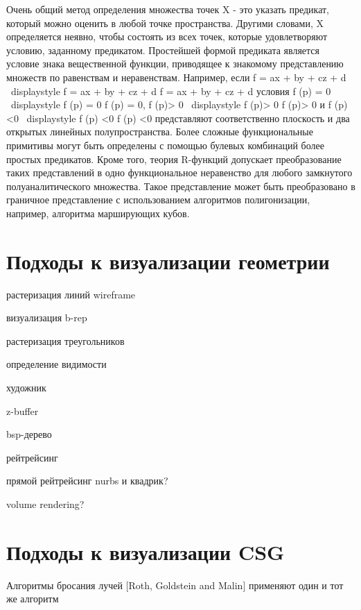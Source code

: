 Очень общий метод определения множества точек X - это указать предикат, который можно оценить в любой точке пространства. Другими словами, X определяется неявно, чтобы состоять из всех точек, которые удовлетворяют условию, заданному предикатом. Простейшей формой предиката является условие знака вещественной функции, приводящее к знакомому представлению множеств по равенствам и неравенствам. Например, если f = ax + by + cz + d {\ displaystyle f = ax + by + cz + d} f = ax + by + cz + d условия f (p) = 0 {\ displaystyle f (p) = 0} f (p) = 0, f (p)> 0 {\ displaystyle f (p)> 0} f (p)> 0 и f (p) <0 {\ displaystyle f (p) <0} f (p) <0 представляют соответственно плоскость и два открытых линейных полупространства. Более сложные функциональные примитивы могут быть определены с помощью булевых комбинаций более простых предикатов. Кроме того, теория R-функций допускает преобразование таких представлений в одно функциональное неравенство для любого замкнутого полуаналитического множества. Такое представление может быть преобразовано в граничное представление с использованием алгоритмов полигонизации, например, алгоритма марширующих кубов.

\section{Подходы к визуализации геометрии} \label{sect_geom_vis}


растеризация линий
wireframe

визуализация b-rep

растеризация треугольников

определение видимости

художник

z-buffer

bsp-дерево

рейтрейсинг

прямой рейтрейсинг nurbs и квадрик?

volume rendering?

\section{Подходы к визуализации CSG} \label{sect_csg_vis}


Алгоритмы бросания лучей [Roth, Goldstein and Malin] применяют один и тот же алгоритм 


